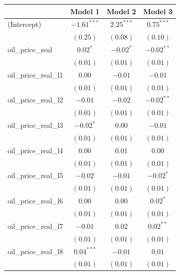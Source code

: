 \documentclass[12pt]{article}
\begin{document}
\begin{table}
\begin{center}
\begin{tabular}{l c c c }
\hline
                             & Model 1 & Model 2 & Model 3 \\
\hline
(Intercept)                  & $-1.61^{***}$ & $2.25^{***}$  & $0.75^{***}$  \\
                             & $(0.25)$      & $(0.08)$      & $(0.10)$      \\
oil_price_real               & $0.02^{*}$    & $-0.02^{*}$   & $-0.02^{**}$  \\
                             & $(0.01)$      & $(0.01)$      & $(0.01)$      \\
oil_price_real_l1            & $0.00$        & $-0.01$       & $-0.01$       \\
                             & $(0.01)$      & $(0.01)$      & $(0.01)$      \\
oil_price_real_l2            & $-0.01$       & $-0.02$       & $-0.02^{**}$  \\
                             & $(0.01)$      & $(0.01)$      & $(0.01)$      \\
oil_price_real_l3            & $-0.02^{*}$   & $0.00$        & $-0.01$       \\
                             & $(0.01)$      & $(0.01)$      & $(0.01)$      \\
oil_price_real_l4            & $0.00$        & $0.01$        & $0.00$        \\
                             & $(0.01)$      & $(0.01)$      & $(0.01)$      \\
oil_price_real_l5            & $-0.02$       & $-0.01$       & $-0.02^{*}$   \\
                             & $(0.01)$      & $(0.01)$      & $(0.01)$      \\
oil_price_real_l6            & $0.00$        & $0.00$        & $0.02^{*}$    \\
                             & $(0.01)$      & $(0.01)$      & $(0.01)$      \\
oil_price_real_l7            & $-0.01$       & $0.02$        & $0.02^{**}$   \\
                             & $(0.01)$      & $(0.01)$      & $(0.01)$      \\
oil_price_real_l8            & $0.04^{***}$  & $-0.01$       & $0.01$        \\
                             & $(0.01)$      & $(0.01)$      & $(0.01)$      \\

\end{tabular}
\end{center}
\end{table}
\end{document}
